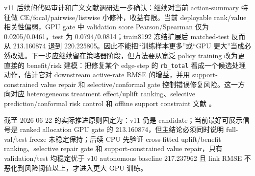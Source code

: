 \documentclass[UTF8,a4paper,11pt]{ctexart}
\newcommand{\code}[1]{\texttt{#1}}
\begin{document}
\begin{table}[H]
\centering
\small
{}
\caption{v11 candidate 策略器方向阶段结果。带 $^{*}$ 的 F1 来自后续 CPU frozen-candidate rerun backfill；对应原始 GPU summary 未保存 per-sample activity 指标，因此 RMSE 以原始 GPU 结果为准，F1 仅作同配置补记。}
\end{table}

v11 后续的代码审计和广义文献调研进一步确认：继续对当前 action-summary 特征做 CE/focal/pairwise/listwise 小修补，收益有限。当前 deployable rank/value 相关性偏弱，GPU gate 中 validation score Pearson/Spearman 仅为 0.0205/0.0461，test 为 0.0794/0.0814；train8192 冻结扩展后 matched-test 反而从 213.160874 退到 220.225805。因此不能把“训练样本更多”或“GPU 更大”当成必然改进。下一步应继续留在策略器阶段，但方法要从宽泛 policy training 改为更直接的 benefit/risk 建模：把修复某个 edge-step 的 \code{rb\_total} 看成一个候选处理动作，估计它对 downstream active-rate RMSE 的增益，并用 support-constrained value repair 和 selective/conformal gate 控制错误修复风险。这一方向对应 heterogeneous treatment effect/uplift ranking、selective prediction/conformal risk control 和 offline support constraint 文献 。

截至 2026-06-22 的实际推进原则固定为：v11 仍是 candidate；当前最好可展示信号是 ranked allocation GPU gate 的 213.160874，但主结论必须同时说明 full-val/test freeze 未稳定保持；后续 CPU 先验证 cross-fitted uplift/benefit ranking、selective repair gate 和 support-constrained value repair，只有 validation/test 均稳定优于 v10 autonomous baseline 217.237962 且 link RMSE 不恶化到风险阈值以上，才进入更大 GPU 训练。
\end{document}
